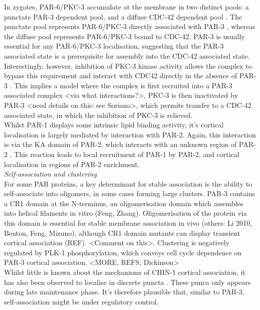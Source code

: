 \documentclass[12pt]{"article"}
\begin{document}
In zygotes, PAR-6/PKC-3 accumulate at the membrane in two distinct pools: a punctate PAR-3 dependent pool, and a diffuse CDC-42 dependent pool \citep{Aceto2006}\citep{Beers2006}. The punctate pool represents PAR-6/PKC-3 directly associated with PAR-3 \citep{Dickinson2017}, whereas the diffuse pool represents PAR-6/PKC-3 bound to CDC-42. PAR-3 is usually essential for any PAR-6/PKC-3 localisation, suggesting that the PAR-3 associated state is a prerequisite for assembly into the CDC-42 associated state. Interestingly, however, inhibition of PKC-3 kinase activity allows the complex to bypass this requirement and interact with CDC42 directly in the absence of PAR-3 \citep{Rodriguez2017}. This implies a model where the complex is first recruited into a PAR-3 associated complex <via what interactions?>, PKC-3 is then inactivated by PAR-3 <need details on this: see Soriano>, which permits transfer to a CDC-42 associated state, in which the inhibition of PKC-3 is relieved.\\

Whilst PAR-1 displays some intrinsic lipid binding activity, it’s cortical localisation is largely mediated by interaction with PAR-2. Again, this interaction is via the KA domain of PAR-2, which interacts with an unknown region of PAR-2 \citep{Motegi2011}. This reaction leads to local recruitment of PAR-1 by PAR-2, and cortical localisation in regions of PAR-2 enrichment.\\


\textit{Self-association and clustering}\\

For some PAR proteins, a key determinant for stable association is the ability to self-associate into oligomers, in some cases forming large clusters. PAR-3 contains a CR1 domain at the N-terminus, an oligomerisation domain which assembles into helical filaments in vitro (Feng, Zhang). Oligomerisation of the protein via this domain is essential for stable membrane association in vivo \citep{Dickinson2017} (others: Li 2010, Benton, Feng, Mizuno), although CR1 domain mutants can display transient cortical association (REF). <Comment on this>. Clustering is negatively regulated by PLK-1 phosphorylation, which conveys cell cycle dependence on PAR-3 cortical association. <MORE, REFS, Dickinson>\\

Whilst little is known about the mechanisms of CHIN-1 cortical association, it has also been observed to localise in discrete puncta \citep{Kumfer2010}. These punca only appears during late maintenance phase. It’s therefore plausible that, similar to PAR-3, self-association might be under regulatory control.\\
\end{document}
